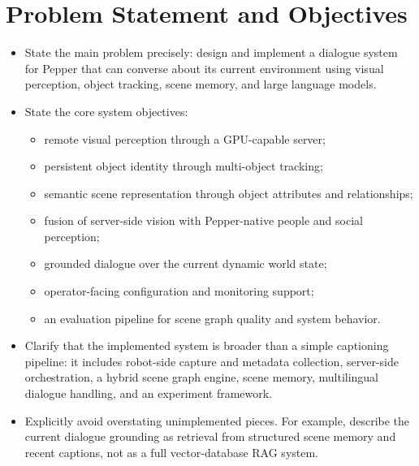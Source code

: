 \documentclass[
  digital,     %
  oneside,     %
  nosansbold,  %
  nocolorbold, %
  lof,         %
  lot,         %
]{fithesis4}
\begin{document}
\section{Problem Statement and Objectives}
\begin{itemize}
    \item State the main problem precisely: design and implement a dialogue system for Pepper that can converse about its current environment using visual perception, object tracking, scene memory, and large language models.
    \item State the core system objectives:
    \begin{itemize}
        \item remote visual perception through a GPU-capable server;
        \item persistent object identity through multi-object tracking;
        \item semantic scene representation through object attributes and relationships;
        \item fusion of server-side vision with Pepper-native people and social perception;
        \item grounded dialogue over the current dynamic world state;
        \item operator-facing configuration and monitoring support;
        \item an evaluation pipeline for scene graph quality and system behavior.
    \end{itemize}
    \item Clarify that the implemented system is broader than a simple captioning pipeline: it includes robot-side capture and metadata collection, server-side orchestration, a hybrid scene graph engine, scene memory, multilingual dialogue handling, and an experiment framework.
    \item Explicitly avoid overstating unimplemented pieces. For example, describe the current dialogue grounding as retrieval from structured scene memory and recent captions, not as a full vector-database RAG system.
\end{itemize}
\end{document}
